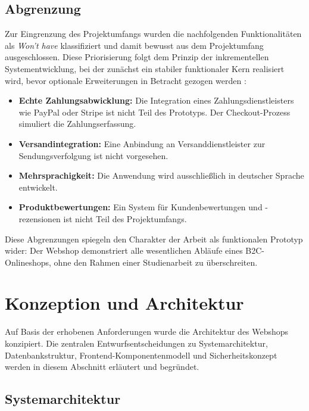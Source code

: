 \subsection{Abgrenzung}
\label{subsec:abgrenzung}

Zur Eingrenzung des Projektumfangs wurden die nachfolgenden Funktionalitäten als \textit{Won't have} klassifiziert und damit bewusst aus dem Projektumfang ausgeschlossen. Diese Priorisierung folgt dem Prinzip der inkrementellen Systementwicklung, bei der zunächst ein stabiler funktionaler Kern realisiert wird, bevor optionale Erweiterungen in Betracht gezogen werden \cite{larman2003, kravchenko2022}:

\begin{itemize}
    \item \textbf{Echte Zahlungsabwicklung:} Die Integration eines Zahlungsdienstleisters wie PayPal oder Stripe ist nicht Teil des Prototyps. Der Checkout-Prozess simuliert die Zahlungserfassung.
    
    \item \textbf{Versandintegration:} Eine Anbindung an Versanddienstleister zur Sendungsverfolgung ist nicht vorgesehen.
    
    \item \textbf{Mehrsprachigkeit:} Die Anwendung wird ausschließlich in deutscher Sprache entwickelt.
    
    \item \textbf{Produktbewertungen:} Ein System für Kundenbewertungen und -rezensionen ist nicht Teil des Projektumfangs.
\end{itemize}

Diese Abgrenzungen spiegeln den Charakter der Arbeit als funktionalen Prototyp wider: Der Webshop demonstriert alle wesentlichen Abläufe eines B2C-Onlineshops, ohne den Rahmen einer Studienarbeit zu überschreiten.

\section{Konzeption und Architektur}
\label{sec:konzeption-architektur}

Auf Basis der erhobenen Anforderungen wurde die Architektur des Webshops konzipiert. Die zentralen Entwurfsentscheidungen zu Systemarchitektur, Datenbankstruktur, Frontend-Komponentenmodell und Sicherheitskonzept werden in diesem Abschnitt erläutert und begründet.

\subsection{Systemarchitektur}
\label{subsec:systemarchitektur}

